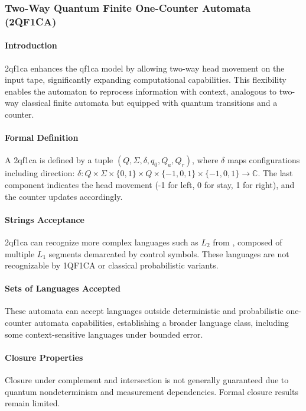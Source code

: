 \subsubsection{Two-Way Quantum Finite One-Counter Automata (2QF1CA)}

\paragraph{Introduction}
\gls{2qf1ca} enhances the \gls{qf1ca} model by allowing two-way head movement on the input tape, significantly expanding computational capabilities. This flexibility enables the automaton to reprocess information with context, analogous to two-way classical finite automata but equipped with quantum transitions and a counter.

\paragraph{Formal Definition}
A \gls{2qf1ca} is defined by a tuple $(Q, \Sigma, \delta, q_0, Q_a, Q_r)$, where $\delta$ maps configurations including direction: $\delta: Q \times \Sigma \times \{0,1\} \times Q \times \{-1,0,1\} \times \{-1,0,1\} \rightarrow \mathbb{C}$. The last component indicates the head movement (-1 for left, 0 for stay, 1 for right), and the counter updates accordingly.

\paragraph{Strings Acceptance}
\gls{2qf1ca} can recognize more complex languages such as $L_2$ from \cite{bonner2001quantum}, composed of multiple $L_1$ segments demarcated by control symbols. These languages are not recognizable by 1QF1CA or classical probabilistic variants.

\paragraph{Sets of Languages Accepted}
These automata can accept languages outside deterministic and probabilistic one-counter automata capabilities, establishing a broader language class, including some context-sensitive languages under bounded error.

\paragraph{Closure Properties}
Closure under complement and intersection is not generally guaranteed due to quantum nondeterminism and measurement dependencies. Formal closure results remain limited.

